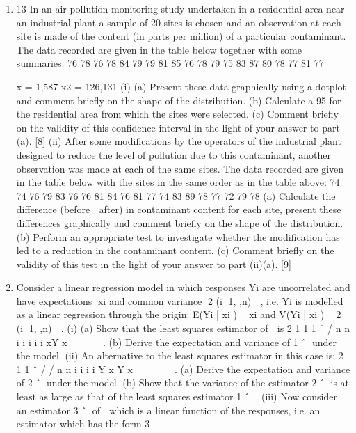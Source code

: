 \documentclass[a4paper,12pt]{article}
\begin{document}
\begin{enumerate}
\item
13 In an air pollution monitoring study undertaken in a residential area near an industrial
plant a sample of 20 sites is chosen and an observation at each site is made of the
content (in parts per million) of a particular contaminant. The data recorded are given
in the table below together with some summaries:
76 78 76 78 84 79 79 81 85 76
78 79 75 83 87 80 78 77 81 77

x = 1,587 
x2 = 126,131
(i) (a) Present these data graphically using a dotplot and comment briefly on
the shape of the distribution.
(b) Calculate a 95%
for the residential area from which the sites were selected.
(c) Comment briefly on the validity of this confidence interval in the light
of your answer to part (a). [8]
(ii) After some modifications by the operators of the industrial plant designed to
reduce the level of pollution due to this contaminant, another observation was
made at each of the same sites. The data recorded are given in the table below
with the sites in the same order as in the table above:
74 74 76 79 83 76 76 81 84 76
81 77 74 83 89 78 77 72 79 78
(a) Calculate the difference (before  after) in contaminant content for
each site, present these differences graphically and comment briefly on
the shape of the distribution.
(b) Perform an appropriate test to investigate whether the modification has
led to a reduction in the contaminant content.
(c) Comment briefly on the validity of this test in the light of your answer
to part (ii)(a). [9]
\item Consider a linear regression model in which responses Yi are uncorrelated and have
expectations xi and common variance 2 (i 1, ,n)  , i.e. Yi is modelled as a linear
regression through the origin:
E(Yi | xi )  xi and V(Yi | xi )  2 (i 1, ,n)  .
(i) (a) Show that the least squares estimator of  is 2
1 1 1
ˆ / n n
i i i i i xY x
 
   .
(b) Derive the expectation and variance of 1 ˆ under the model. 
(ii) An alternative to the least squares estimator in this case is:
2
1 1
ˆ / /
n n
i i
i i
Y x Y x
 
    .
(a) Derive the expectation and variance of 2 ˆ under the model.
(b) Show that the variance of the estimator 2 ˆ is at least as large as that of
the least squares estimator 1 ˆ . 
(iii) Now consider an estimator 3 ˆ of  which is a linear function of the
responses, i.e. an estimator which has the form 3

\end{enumerate}
\end{document}
